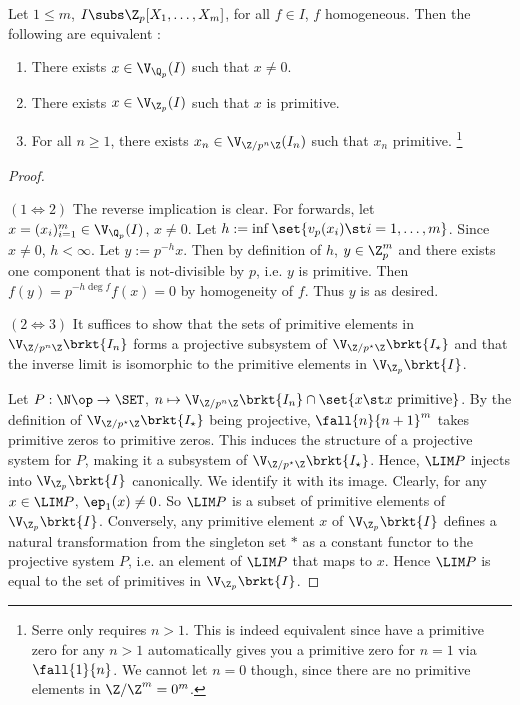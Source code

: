\begin{prop}

  Let $1\leq m$, $I \subs \Z_p[X_1,\dots,X_m]$,
  for all $f \in I$, $f$ homogeneous. 
  Then the following are equivalent : 
  \begin{enumerate}
    \item There exists $x \in \V_{\Q_p}(I)$ such that $x \neq 0$.
    \item There exists $x \in \V_{\Z_p}(I)$ such that $x$ is primitive.
    \item For all $n \geq 1$, 
    there exists $x_n \in \V_{\Z/p^n\Z}(I_n)$ such that $x_n$ primitive.
    \footnote{
      Serre only requires $n > 1$. 
      This is indeed equivalent since have a primitive zero for any $n > 1$
      automatically gives you a primitive zero for $n = 1$ via $\fall{1}{n}$. 
      We cannot let $n = 0$ though, since there are no primitive elements in 
      ${\Z/\Z}^m = 0^m$. 
    }
  \end{enumerate}
\end{prop}
\begin{proof}~
  
  $(1\iff 2)$ The reverse implication is clear. 
  For forwards, let $x = (x_i)_{i = 1}^m \in \V_{\Q_p}(I)$, $x \neq 0$. 
  Let $h := \inf\set{v_p(x_i) \st i = 1, \dots, m}$.
  Since $x \neq 0$, $h < \infty$.
  Let $y := p^{-h}x$. 
  Then by definition of $h$, $y \in \Z_p^m$ and there exists one component 
  that is not-divisible by $p$, i.e. $y$ is primitive. 
  Then $f(y) = p^{-h\deg f}f(x) = 0$ by homogeneity of $f$. 
  Thus $y$ is as desired.
  
  $(2 \iff 3)$ It suffices to show that 
  the sets of primitive elements in $\V_{\Z/p^n\Z}\brkt{I_n}$ forms a 
  projective subsystem of $\V_{\Z/p^\star\Z}\brkt{I_\star}$ and that 
  the inverse limit is isomorphic to the primitive elements in 
  $\V_{\Z_p}\brkt{I}$.
  
  Let $P : \N\op \to \SET$, 
  $n \mapsto \V_{\Z/p^n\Z}\brkt{I_n} \cap \set{x \st x \text{ primitive}}$. 
  By the definition of $\V_{\Z/p^\star\Z}\brkt{I_\star}$ being projective, 
  ${\fall{n}{n+1}}^m$ takes primitive zeros to primitive zeros.
  This induces the structure of a projective system for $P$,
  making it a subsystem of $\V_{\Z/p^\star\Z}\brkt{I_\star}$.
  Hence, $\LIM P$ injects into $\V_{\Z_p}\brkt{I}$ canonically. 
  We identify it with its image. 
  Clearly, for any $x \in \LIM P$, $\ep_1(x) \neq 0$. 
  So $\LIM P$ is a subset of primitive elements of $\V_{\Z_p}\brkt{I}$.
  Conversely, any primitive element $x$ of $\V_{\Z_p}\brkt{I}$ defines 
  a natural transformation from the singleton set $*$ as a constant functor
  to the projective system $P$,
  i.e. an element of $\LIM P$ that maps to $x$. 
  Hence $\LIM P$ is equal to 
  the set of primitives in $\V_{\Z_p}\brkt{I}$.
\end{proof}


